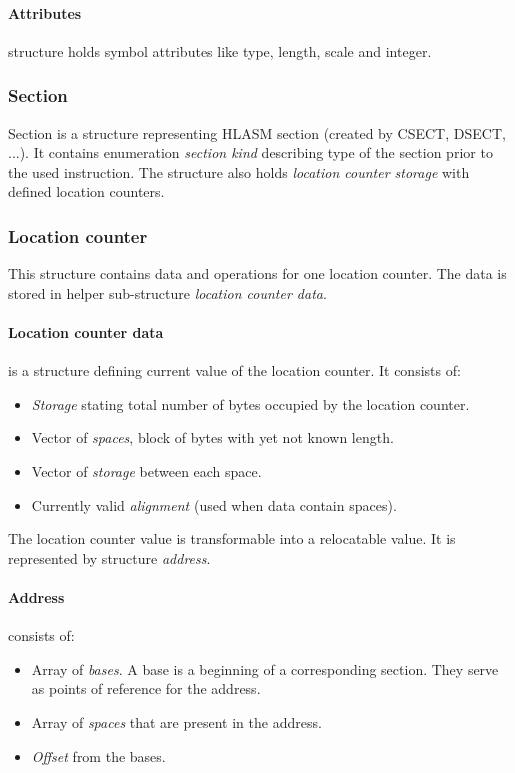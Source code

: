 \paragraph*{Attributes} structure holds symbol attributes like type, length, scale and integer.

\subsubsection{Section}

Section is a structure representing HLASM section (created by CSECT, DSECT, ...). It contains enumeration \emph{section kind} describing type of the section prior to the used instruction. The structure also holds \emph{location counter storage} with defined location counters.

\subsubsection{Location counter}

This structure contains data and operations for one location counter. The data is stored in helper sub-structure \emph{location counter data}.

\paragraph*{Location counter data} is a structure defining current value of the location counter. It consists of:
\begin{itemize}
	\item \emph{Storage} stating total number of bytes occupied by the location counter.
	\item Vector of \emph{spaces}, block of bytes with yet not known length.
	\item Vector of \emph{storage} between each space.
	\item Currently valid \emph{alignment} (used when data contain spaces).
\end{itemize}

The location counter value is transformable into a relocatable value. It is represented by structure \emph{address}.

\paragraph*{Address} consists of:
\begin{itemize}
	\item Array of \emph{bases}. A base is a beginning of a corresponding section. They serve as points of reference for the address.
	\item Array of \emph{spaces} that are present in the address. 
	\item \emph{Offset} from the bases.
\end{itemize}

